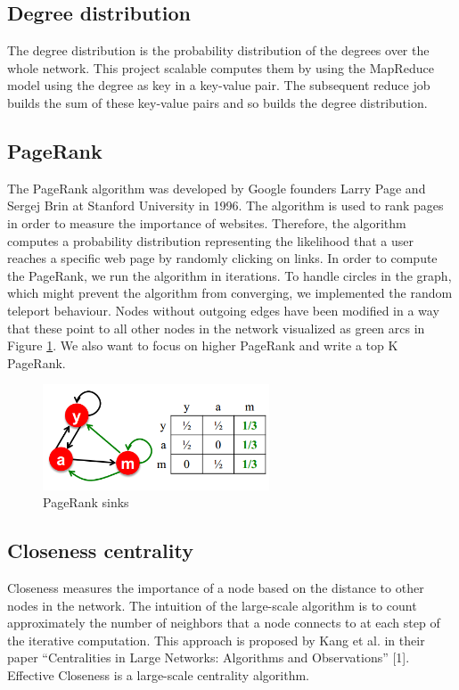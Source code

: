\subsection{Degree distribution}
The degree distribution is the probability distribution of the degrees over the whole network. This project scalable computes them by using the MapReduce model using the degree as key in a key-value pair. The subsequent reduce job builds the sum of these key-value pairs and so builds the degree distribution.

\subsection{PageRank}
The PageRank algorithm was developed by Google founders Larry Page and Sergej Brin at Stanford University in 1996. The algorithm is used to rank pages in order to measure the importance of websites. Therefore, the algorithm computes a probability distribution representing the likelihood that a user reaches a specific web page by randomly clicking on links. In order to compute the PageRank, we run the algorithm in iterations. To handle circles in the graph, which might prevent the algorithm from converging, we implemented the random teleport behaviour. Nodes without outgoing edges have been modified in a way that these point to all other nodes in the network visualized as green arcs in Figure \ref{fig2}. We also want to focus on higher PageRank and write a top K PageRank.

\begin{figure}[H]
	\begin{center}
		\caption{PageRank sinks}	
		\label{fig2}		
		\includegraphics[width=0.6\textwidth]{fig2}	
	\end{center}
\end{figure}

\subsection{Closeness centrality}
Closeness measures the importance of a node based on the distance to other nodes in the network. The intuition of the large-scale algorithm is to count approximately the number of neighbors that a node connects to at each step of the iterative computation. This approach is proposed by Kang et al. in their paper “Centralities in Large Networks: Algorithms and Observations” [1]. Effective Closeness is a large-scale centrality algorithm. 

